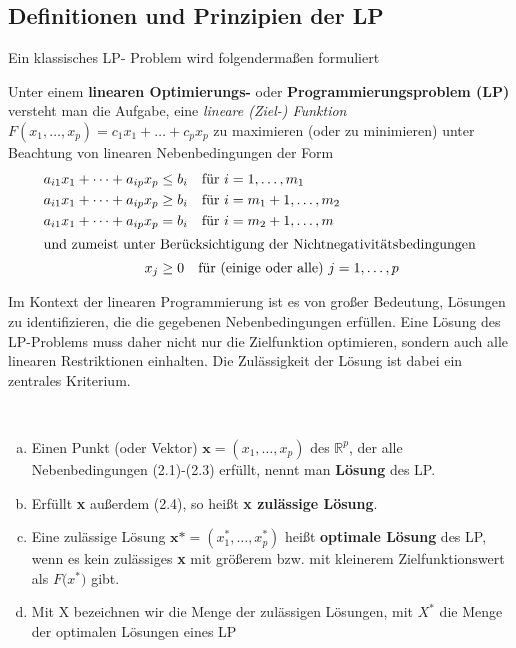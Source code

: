\documentclass[bachelor, german]{algothesis}
\begin{document}
\subsection{Definitionen und Prinzipien der LP}
Ein klassisches LP- Problem wird folgendermaßen formuliert
\begin{definition}
    Unter einem \textbf{linearen Optimierungs-} oder \textbf{Programmierungsproblem (LP)} versteht man die Aufgabe, eine \textit{lineare (Ziel-) Funktion} $F(x_1,\dots, x_p) = c_1x_1 + \dots + c_px_p$ zu maximieren (oder zu minimieren) unter Beachtung von linearen Nebenbedingungen der Form
    \begin{align}
    a_{i1}x_1 + \dots + a_{ip}x_p &\leq b_i \quad \text{für } i = 1,\dots, m_1 \\
    a_{i1}x_1 + \dots + a_{ip}x_p &\geq b_i \quad \text{für } i = m_1+1,\dots, m_2 \\
    a_{i1}x_1 + \dots + a_{ip}x_p &= b_i \quad \text{für } i = m_2+1,\dots, m \\
    \intertext{und zumeist unter Berücksichtigung der Nichtnegativitätsbedingungen}
    x_j &\geq 0 \quad \text{für (einige oder alle) } j = 1,\dots,p
\end{align}
\end{definition}
 Im Kontext der linearen Programmierung ist es von großer Bedeutung, Lösungen zu identifizieren, die die gegebenen Nebenbedingungen erfüllen. Eine Lösung des LP-Problems muss daher nicht nur die Zielfunktion optimieren, sondern auch alle linearen Restriktionen einhalten. Die Zulässigkeit der Lösung ist dabei ein zentrales Kriterium. 
\begin{definition}
    \leavevmode\
    \begin{enumerate}[a)]
        \item Einen Punkt (oder Vektor) $\textbf{x} = (x_1,\dots,x_p)$ des $\mathbb{R}^p$, der alle Nebenbedingungen (2.1)-(2.3) erfüllt, nennt man \textbf{Lösung} des LP.
        \item Erfüllt \textbf{x} außerdem (2.4), so heißt \textbf{x zulässige Lösung}.
        \item Eine zulässige Lösung $\textbf{x*} = (x^*_1, \dots, x^*_p)$ heißt \textbf{optimale Lösung} des LP, wenn es kein zulässiges \textbf{x} mit größerem bzw. mit kleinerem Zielfunktionswert als $F($\textbf{$x^*$}$)$ gibt.
        \item Mit X bezeichnen wir die Menge der zulässigen Lösungen, mit $X^*$ die Menge der optimalen Lösungen eines LP
    \end{enumerate}
\end{definition}
\end{document}
